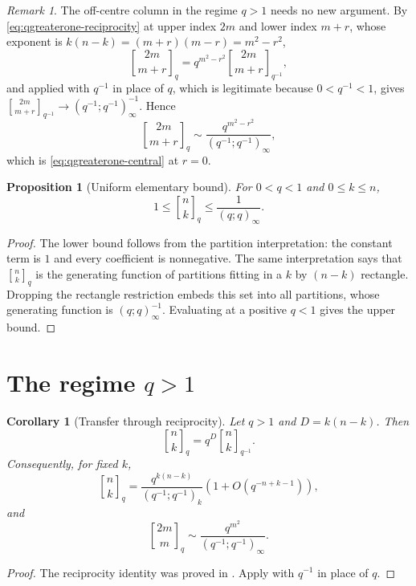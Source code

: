 \documentclass[11pt,oneside,openany]{book}
\newtheorem{proposition}[proposition]{Proposition}
\newtheorem{corollary}[corollary]{Corollary}
\theoremstyle{definition}
\theoremstyle{remark}
\newtheorem{remark}[remark]{Remark}
\newcommand{\qbinom}[2]{\genfrac{[}{]}{0pt}{}{#1}{#2}_{q}}
\newcommand{\Qbinom}[3]{\genfrac{[}{]}{0pt}{}{#1}{#2}_{#3}}
\begin{document}
\begin{remark}\label{rem:offcentre-qgreaterone}
The off-centre column in the regime $q>1$ needs no new argument.  By
\eqref{eq:qgreaterone-reciprocity} at upper index $2m$ and lower index $m+r$,
whose exponent is $k(n-k)=(m+r)(m-r)=m^2-r^2$,
\[
 \qbinom{2m}{m+r}=q^{m^2-r^2}\Qbinom{2m}{m+r}{q^{-1}},
\]
and  applied with $q^{-1}$ in place of $q$, which is
legitimate because $0<q^{-1}<1$, gives
$\Qbinom{2m}{m+r}{q^{-1}}\to(q^{-1};q^{-1})_\infty^{-1}$.  Hence
\[
 \qbinom{2m}{m+r}
 \sim\frac{q^{m^2-r^2}}{(q^{-1};q^{-1})_\infty},
\]
which is \eqref{eq:qgreaterone-central} at $r=0$.
\end{remark}

\begin{proposition}[Uniform elementary bound]\label{prop:gaussian-bound}
For $0<q<1$ and $0\le k\le n$,
\[
 1\le\qbinom nk\le\frac1{(q;q)_\infty}.
 \tag{19.8}\label{eq:gaussian-bound}
\]
\end{proposition}

\begin{proof}
The lower bound follows from the partition interpretation: the constant term is $1$ and every coefficient is nonnegative.  The same interpretation says that $\qbinom nk$ is the generating function of partitions fitting in a $k$ by $(n-k)$ rectangle.  Dropping the rectangle restriction embeds this set into all partitions, whose generating function is $(q;q)_\infty^{-1}$.  Evaluating at a positive $q<1$ gives the upper bound.
\end{proof}

\section{The regime \texorpdfstring{$q>1$}{q greater than 1}}

\begin{corollary}[Transfer through reciprocity]\label{cor:qgreaterone}
Let $q>1$ and $D=k(n-k)$.  Then
\[
 \qbinom nk=q^D\Qbinom nk{q^{-1}}.
 \tag{19.9}\label{eq:qgreaterone-reciprocity}
\]
Consequently, for fixed $k$,
\[
 \qbinom nk
 =\frac{q^{k(n-k)}}{(q^{-1};q^{-1})_k}
 \left(1+O(q^{-n+k-1})\right),
 \tag{19.10}\label{eq:qgreaterone-fixed-k}
\]
and
\[
 \qbinom{2m}{m}
 \sim\frac{q^{m^2}}{(q^{-1};q^{-1})_\infty}.
 \tag{19.11}\label{eq:qgreaterone-central}
\]
\end{corollary}

\begin{proof}
The reciprocity identity was proved in .  Apply  with $q^{-1}$ in place of $q$.
\end{proof}
\end{document}
